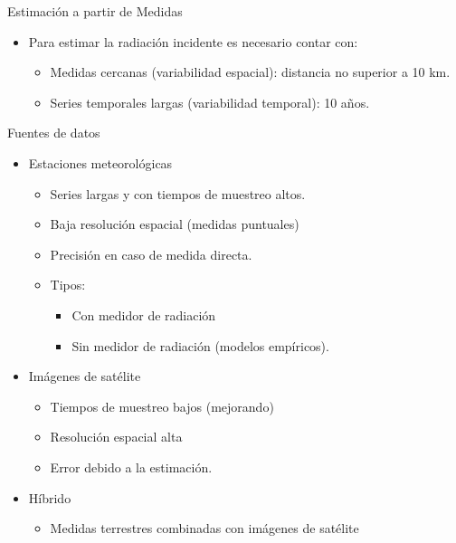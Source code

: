 \documentclass[xcolor={usenames,svgnames,dvipsnames}]{beamer}
\begin{document}
\begin{frame}[label={sec:orgfcdd5e8}]{Estimación a partir de Medidas}
\begin{itemize}
\item Para estimar la radiación incidente es necesario contar con:
\begin{itemize}
\item \alert{Medidas cercanas} (variabilidad espacial): distancia no superior a 10 km.
\item \alert{Series temporales} largas (variabilidad temporal): 10 años.
\end{itemize}
\end{itemize}
\end{frame}

\begin{frame}[label={sec:org5616454}]{Fuentes de datos}
\begin{itemize}
\item \alert{Estaciones meteorológicas}
\begin{itemize}
\item Series largas y con tiempos de muestreo altos.
\item Baja resolución espacial (medidas puntuales)
\item Precisión en caso de medida directa.
\item Tipos: 
\begin{itemize}
\item Con medidor de radiación
\item Sin medidor de radiación (modelos empíricos).
\end{itemize}
\end{itemize}
\end{itemize}

\pause

\begin{itemize}
\item \alert{Imágenes de satélite}

\begin{itemize}
\item Tiempos de muestreo bajos (mejorando)

\item Resolución espacial alta

\item Error debido a la estimación.
\end{itemize}
\end{itemize}

\pause 

\begin{itemize}
\item \alert{Híbrido}

\begin{itemize}
\item Medidas terrestres combinadas con imágenes de satélite
\end{itemize}
\end{itemize}
\end{frame}
\end{document}
